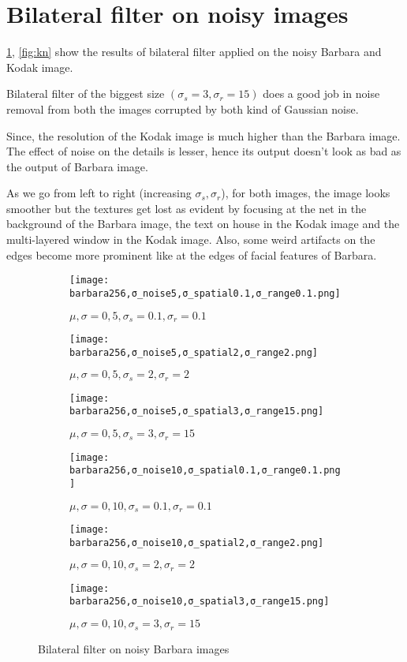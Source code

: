 \documentclass[a4paper, landscape]{article}
\begin{document}
\section{Bilateral filter on noisy images}
\ref{fig:bn}, \ref{fig:kn} show the results of bilateral filter applied on the noisy Barbara and Kodak image.

Bilateral filter of the biggest size $(\sigma_s=3, \sigma_r=15)$ does a good job in noise removal from both the images corrupted by both kind of Gaussian noise. 

Since, the resolution of the Kodak image is much higher than the Barbara image. The effect of noise on the details is lesser, hence its output doesn't look as bad as the output of Barbara image. 

As we go from left to right (increasing $\sigma_s, \sigma_r$), for both images, the image looks smoother but the textures get lost as evident by focusing at the net in the background of the Barbara image, the text on house in the Kodak image and the multi-layered window in  the Kodak image. Also, some weird artifacts on the edges become more prominent like at the edges of facial features of Barbara.
\begin{figure}
    \centering
    \begin{subfigure}{0.33\linewidth}
        \centering
        \texttt{[image: barbara256,σ\_noise5,σ\_spatial0.1,σ\_range0.1.png]}
        \caption{$\mu, \sigma = 0, 5, \sigma_s=0.1, \sigma_r=0.1$}
    \end{subfigure}
    \begin{subfigure}{0.33\linewidth}
        \centering
        \texttt{[image: barbara256,σ\_noise5,σ\_spatial2,σ\_range2.png]}
        \caption{$\mu, \sigma = 0, 5, \sigma_s=2, \sigma_r=2$}
    \end{subfigure}
    \begin{subfigure}{0.33\linewidth}
        \centering
        \texttt{[image: barbara256,σ\_noise5,σ\_spatial3,σ\_range15.png]}
        \caption{$\mu, \sigma = 0, 5, \sigma_s=3, \sigma_r=15$}
    \end{subfigure}
    \begin{subfigure}{0.33\linewidth}
        \centering
        \texttt{[image: barbara256,σ\_noise10,σ\_spatial0.1,σ\_range0.1.png]}
        \caption{$\mu, \sigma = 0, 10, \sigma_s=0.1, \sigma_r=0.1$}
    \end{subfigure}
    \begin{subfigure}{0.33\linewidth}
        \centering
        \texttt{[image: barbara256,σ\_noise10,σ\_spatial2,σ\_range2.png]}
        \caption{$\mu, \sigma = 0, 10, \sigma_s=2, \sigma_r=2$}
    \end{subfigure}
    \begin{subfigure}{0.33\linewidth}
        \centering
        \texttt{[image: barbara256,σ\_noise10,σ\_spatial3,σ\_range15.png]}
        \caption{$\mu, \sigma = 0, 10, \sigma_s=3, \sigma_r=15$}
    \end{subfigure}
    \caption{Bilateral filter on noisy Barbara images}
    \label{fig:bn}
\end{figure}
\end{document}

